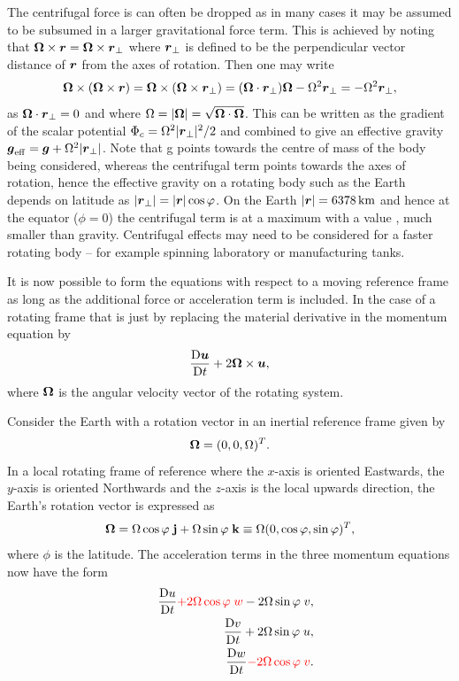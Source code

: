 The centrifugal force is can often be dropped as in many cases 
it may be assumed to be subsumed in a larger gravitational force term.
This is achieved by noting that ${\mbox{\boldmath$\Omega$}}\times{\mbox{\boldmath$r$}}={\mbox{\boldmath$\Omega$}}\times{\mbox{\boldmath$r$}}_\perp$ where ${\mbox{\boldmath$r$}}_\perp$
is defined to be the perpendicular vector distance of ${\mbox{\boldmath$r$}}$ from the axes of rotation. Then one may write
\begin{equation*}
{\mbox{\boldmath$\Omega$}}\times({\mbox{\boldmath$\Omega$}}\times{\mbox{\boldmath$r$}}) = {\mbox{\boldmath$\Omega$}}\times({\mbox{\boldmath$\Omega$}}\times{\mbox{\boldmath$r$}}_\perp) = ({\mbox{\boldmath$\Omega$}}\cdot{\mbox{\boldmath$r$}}_\perp){\mbox{\boldmath$\Omega$}} - \Omega^2{\mbox{\boldmath$r$}}_\perp = - \Omega^2{\mbox{\boldmath$r$}}_\perp,
\end{equation*}
as ${\mbox{\boldmath$\Omega$}}\cdot{\mbox{\boldmath$r$}}_\perp=0$ and where $\Omega=|{\mbox{\boldmath$\Omega$}}|=\sqrt{{\mbox{\boldmath$\Omega$}}\cdot{\mbox{\boldmath$\Omega$}}}$.
This can be written as the gradient of the scalar
potential $\Phi_c = \Omega^2|{\mbox{\boldmath$r$}}_\perp|^2/2$ and combined to give an effective gravity 
${\mbox{\boldmath$g$}}_{\mathrm{eff}} = {\mbox{\boldmath$g$}} + \Omega^2|{\mbox{\boldmath$r$}}_\perp|$. Note that g
points towards the centre of mass of the body being considered, whereas the centrifugal term points
towards the axes of rotation, hence the effective gravity on a rotating body such as the Earth depends
on latitude as $|{\mbox{\boldmath$r$}}_\perp|=|{\mbox{\boldmath$r$}}|\cos\varphi$. On the Earth $|\bmr|=\km[6378]$ and hence at the equator ($\phi=0$)
the centrifugal term is at a maximum with a value \mss[0.034], \ie much smaller than gravity. Centrifugal
effects may need to be considered for a faster rotating body -- for example spinning laboratory or manufacturing tanks.

It is now possible to form the
equations with respect to a moving reference frame as long as the
additional force or acceleration term is included.
In the case of a rotating frame that is
just by replacing the material derivative in the momentum equation by
\begin{equation}
\frac{\mathrm{D}{\mbox{\boldmath$u$}}}{\mathrm{D} t} + 2{\mbox{\boldmath$\Omega$}}\times{\mbox{\boldmath$u$}},
\end{equation}
where ${\mbox{\boldmath$\Omega$}}$ is the angular velocity vector of the rotating
system.

Consider the Earth with a rotation vector in an inertial reference frame given by 
\begin{equation}\label{eq:on_sphere_rotation}
{\mbox{\boldmath$\Omega$}}=(0,0,\Omega)^T.
\end{equation}
In a local rotating frame of reference where the
$x$-axis is oriented Eastwards,
the $y$-axis is oriented Northwards and the $z$-axis is the local upwards direction,
the Earth's rotation vector is expressed as
\begin{equation*}
{\mbox{\boldmath$\Omega$}} = \Omega \cos \varphi\; {\bf j} + \Omega \sin \varphi\; {\bf k} \equiv \Omega (0,\cos\varphi,\sin\varphi)^T,
\end{equation*}
where $\phi$ is the latitude.
The acceleration terms in the three momentum equations now have the form
{\setlength\arraycolsep{2pt}
\begin{eqnarray*}
&&\frac{\mathrm{D} u}{\mathrm{D} t} {\color{red}+} {\color{red}2\Omega\cos\varphi\; w} - 2\Omega\sin\varphi\; v,\\
&&\frac{\mathrm{D} v}{\mathrm{D} t} + 2\Omega\sin\varphi\; u,\\
&&\frac{\mathrm{D} w}{\mathrm{D} t} {\color{red}-} {\color{red}2\Omega\cos\varphi\; v}.
\end{eqnarray*}}


